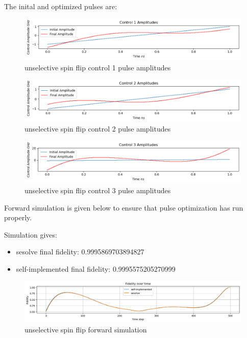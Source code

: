 \documentclass[12pt]{report}
\begin{document}
The inital and optimized pulses are: 
\begin{figure}[H]
    \centering
    \includegraphics[width=0.95\linewidth]{unselective_spin_flip_control1.png}
    \caption{unselective spin flip control 1 pulse amplitudes}
    \label{fig:unselective_spin_flip_control1}
\end{figure}
\begin{figure}[H]
    \centering
    \includegraphics[width=0.95\linewidth]{unselective_spin_flip_control2.png}
    \caption{unselective spin flip control 2 pulse amplitudes}
    \label{fig:unselective_spin_flip_control2}
\end{figure}
\begin{figure}[H]
    \centering
    \includegraphics[width=0.95\linewidth]{unselective_spin_flip_control3.png}
    \caption{unselective spin flip control 3 pulse amplitudes}
    \label{fig:unselective_spin_flip_control3}
\end{figure}

Forward simulation is given below to ensure that pulse optimization has run properly. 
\par
Simulation gives: 
\begin{itemize}
    \item sesolve final fidelity:  0.9995869703894827
    \item self-implemented final fidelity:  0.9995575205270999
\end{itemize}
\begin{figure}[H]
    \centering
    \includegraphics[width=0.95\linewidth]{unselective_spin_flip_simulation.png}
    \caption{unselective spin flip forward simulation}
    \label{fig:unselective_spin_flip_forward_simulation}
\end{figure}
\end{document}
